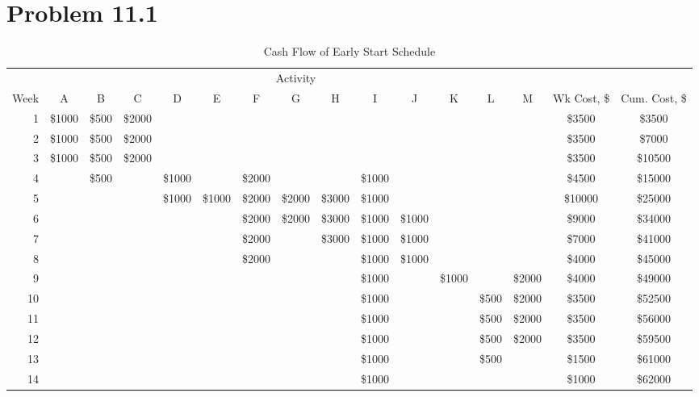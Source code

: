 \documentclass{article}
\begin{document}
	\section*{Problem 11.1}
	{\renewcommand{\arraystretch}{1.2} 
	\begin{sidewaystable}[!htbp]
  		\begin{center}
    		\caption{Cash Flow of Early Start Schedule}
    		\label{tab:table1}
			
    		\begin{tabular}{rccccccccccccccc}
				 & \multicolumn{13}{c}{Activity} &  &  \\
				Week & A & B & C & D & E & F & G & H & I & J & K & L & M & Wk Cost, \$ & Cum. Cost, \$\\
				\hline
      			1 & \$1000 & \$500 & \$2000 &\multicolumn{10}{c}{} & \$3500 & \$3500\\
      			2 & \$1000 & \$500 & \$2000 &\multicolumn{10}{c}{} & \$3500 & \$7000\\
				3 & \$1000 & \$500 & \$2000 &\multicolumn{10}{c}{} & \$3500 & \$10500\\
				4 &        & \$500 &        &\$1000 & & \$2000 & & & \$1000 & \multicolumn{4}{c}{} &\$4500 & \$15000\\
				5 &\multicolumn{3}{c}{} &\$1000 & \$1000 & \$2000 & \$2000 & \$3000 & \$1000 & \multicolumn{4}{c}{} & \$10000 & \$25000\\
				6 &\multicolumn{5}{c}{} & \$2000 & \$2000 & \$3000 & \$1000 & \$1000 & \multicolumn{3}{c}{} & \$9000 & \$34000\\
				7 &\multicolumn{5}{c}{} & \$2000 & & \$3000 & \$1000 & \$1000& \multicolumn{3}{c}{} & \$7000 & \$41000\\
				8 &\multicolumn{5}{c}{} & \$2000 & &  & \$1000 & \$1000& \multicolumn{3}{c}{} & \$4000 & \$45000\\
				9 &\multicolumn{6}{c}{} & &  & \$1000 & & \$1000 & & \$2000& \$4000 & \$49000\\
				10 &\multicolumn{8}{c}{} & \$1000 & &  &\$500 & \$2000& \$3500 & \$52500\\
				11 &\multicolumn{8}{c}{} & \$1000 & &  &\$500 & \$2000& \$3500 & \$56000\\
				12 &\multicolumn{8}{c}{} & \$1000 & &  &\$500 & \$2000& \$3500 & \$59500\\
				13 &\multicolumn{8}{c}{} & \$1000 & &  &\$500 & & \$1500 & \$61000\\
				14 &\multicolumn{8}{c}{} & \$1000 & &  & & & \$1000 & \$62000\\
				\hline
    		\end{tabular}
  		\end{center}
	\end{sidewaystable}
	}
	
\end{document}
